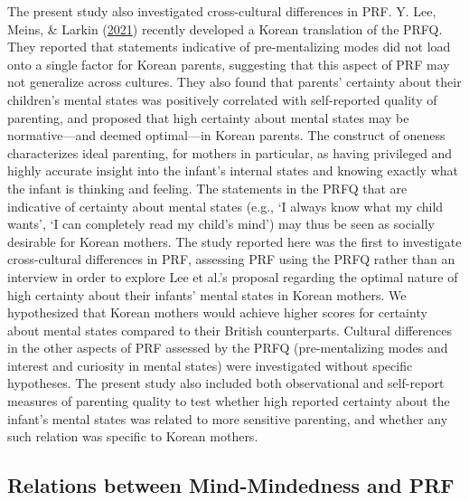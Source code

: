 \documentclass[
]{article}
\begin{document}
The present study also investigated cross-cultural differences in PRF. Y. Lee, Meins, \& Larkin (\protect\hyperlink{ref-Lee2021}{2021}) recently developed a Korean translation of the PRFQ. They reported that statements indicative of pre-mentalizing modes did not load onto a single factor for Korean parents, suggesting that this aspect of PRF may not generalize across cultures. They also found that parents' certainty about their children's mental states was positively correlated with self-reported quality of parenting, and proposed that high certainty about mental states may be normative---and deemed optimal---in Korean parents. The construct of oneness characterizes ideal parenting, for mothers in particular, as having privileged and highly accurate insight into the infant's internal states and knowing exactly what the infant is thinking and feeling. The statements in the PRFQ that are indicative of certainty about mental states (e.g., `I always know what my child wants', `I can completely read my child's mind') may thus be seen as socially desirable for Korean mothers. The study reported here was the first to investigate cross-cultural differences in PRF, assessing PRF using the PRFQ rather than an interview in order to explore Lee et al.'s proposal regarding the optimal nature of high certainty about their infants' mental states in Korean mothers. We hypothesized that Korean mothers would achieve higher scores for certainty about mental states compared to their British counterparts. Cultural differences in the other aspects of PRF assessed by the PRFQ (pre-mentalizing modes and interest and curiosity in mental states) were investigated without specific hypotheses. The present study also included both observational and self-report measures of parenting quality to test whether high reported certainty about the infant's mental states was related to more sensitive parenting, and whether any such relation was specific to Korean mothers.

\hypertarget{relations-between-mind-mindedness-and-prf}{%
\subsection*{Relations between Mind-Mindedness and PRF}\label{relations-between-mind-mindedness-and-prf}}
\end{document}
